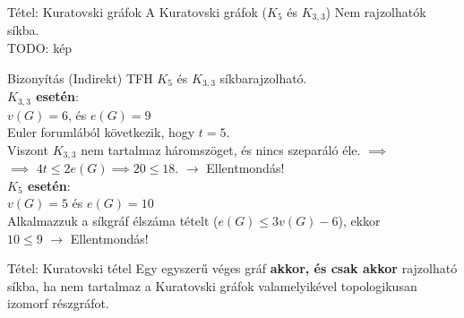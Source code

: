 \documentclass{beamer}
\begin{document}
\begin{frame}
\begin{block}{Tétel: Kuratovski gráfok}
A Kuratovski gráfok ($K_5$ és $K_{3,3}$) Nem rajzolhatók síkba.\\
TODO: kép

\end{block}

\begin{block}{Bizonyítás (Indirekt)}
TFH $K_5$ és $K_{3,3}$ síkbarajzolható.\\
\smallskip
\textbf{$K_{3,3}$ esetén}:\\
$v(G) = 6$, és $e(G) = 9$\\
Euler forumlából következik, hogy $t = 5$.\\
Viszont $K_{3,3}$ nem tartalmaz háromszöget, és nincs szeparáló éle. $\implies$\\
$\implies$ $4t \leq 2e(G) \implies 20 \leq 18$. $\rightarrow$ Ellentmondás!\\
\smallskip
\textbf{$K_5$ esetén}:\\
$v(G) = 5$ és $e(G) = 10$\\
Alkalmazzuk a síkgráf élszáma tételt ($e(G) \leq 3v(G) - 6$), ekkor\\
$10 \leq 9$ $\rightarrow$ Ellentmondás!

\end{block}

\end{frame}

\begin{frame}
\begin{block}{Tétel: Kuratovski tétel}
Egy egyszerű véges gráf \textbf{akkor, és csak akkor} rajzolható síkba, ha nem tartalmaz a Kuratovski gráfok valamelyikével topologikusan izomorf részgráfot.

\end{block}

\end{frame}
\end{document}
